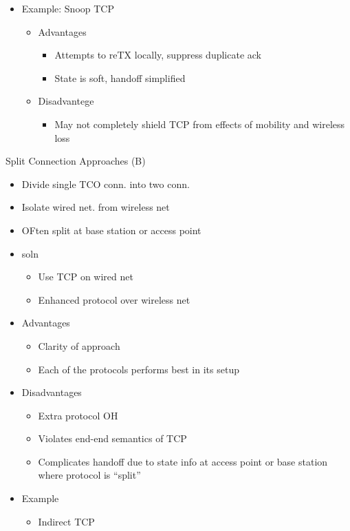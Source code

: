\begin{itemize}
	\item Example: Snoop TCP
	\begin{itemize}
		\item Advantages
		\begin{itemize}
			\item Attempts to reTX locally, suppress duplicate ack
			\item State is soft, handoff simplified
		\end{itemize}
		\item Disadvantege
		\begin{itemize}
			\item May not completely shield TCP from effects of
				mobility and wireless loss
		\end{itemize}
	\end{itemize}
\end{itemize}
Split Connection Approaches (B)
\begin{itemize}
	\item Divide single TCO conn. into two conn.
	\item Isolate wired net. from wireless net
	\item OFten split at base station or access point
	\item soln
	\begin{itemize}
		\item Use TCP on wired net
		\item Enhanced protocol over wireless net
	\end{itemize}
	\item Advantages
		\begin{itemize}
			\item Clarity of approach
			\item Each of the protocols performs best in its setup
		\end{itemize}
	\item Disadvantages
	\begin{itemize}
		\item Extra protocol OH
		\item Violates end-end semantics of TCP
		\item Complicates handoff due to state info at access point or
			base station where protocol is ``split''
	\end{itemize}
	\item Example
	\begin{itemize}
		\item Indirect TCP
	\end{itemize}
\end{itemize}
